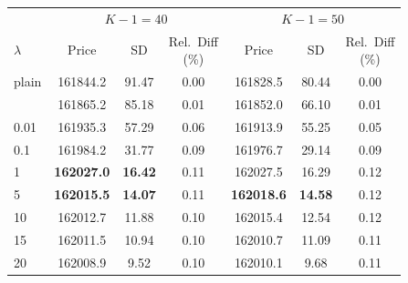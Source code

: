 \begin{table}
\vspace{1em}

\begin{tabular}[t]{lcccccc}
\multicolumn{1}{c}{ } & \multicolumn{3}{c}{$K-1 = 40$} & \multicolumn{3}{c}{$K-1 = 50$} \\
\cmidrule(l{3pt}r{3pt}){2-4} \cmidrule(l{3pt}r{3pt}){5-7}
$\lambda$ & Price & SD & \shortstack{Rel.\ Diff\\(\%)} & Price & SD & \shortstack{Rel.\ Diff\\(\%)}\\
\midrule
plain & 161844.2 & 91.47 & 0.00 & 161828.5 & 80.44 & 0.00\\
\addlinespace
0.001 & 161865.2 & 85.18 & 0.01 & 161852.0 & 66.10 & 0.01\\
0.01 & 161935.3 & 57.29 & 0.06 & 161913.9 & 55.25 & 0.05\\
0.1 & 161984.2 & 31.77 & 0.09 & 161976.7 & 29.14 & 0.09\\
1 & \textbf{\textcolor{priceorange}{162027.0}} & \textbf{16.42} & 0.11 & \textcolor{priceorange}{162027.5} & 16.29 & 0.12\\
5 & \textbf{\textcolor{priceorange}{162015.5}} & \textbf{14.07} & 0.11 & \textbf{\textcolor{priceorange}{162018.6}} & \textbf{14.58} & 0.12\\
10 & 162012.7 & \textcolor{sdblue}{11.88} & 0.10 & 162015.4 & 12.54 & 0.12\\
15 & 162011.5 & \textcolor{sdblue}{10.94} & 0.10 & 162010.7 & \textcolor{sdblue}{11.09} & 0.11\\
20 & 162008.9 & \textcolor{sdblue}{9.52} & 0.10 & 162010.1 & \textcolor{sdblue}{9.68} & 0.11\\
\bottomrule
\end{tabular}
\end{table}

